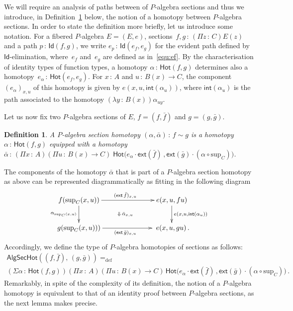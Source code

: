 \documentclass[10pt,a4paper,oneside,reqno]{amsart}
\numberwithin{equation}{section}
\theoremstyle{mythm}
\theoremstyle{mydef}
\newtheorem{definition}[theorem]{Definition}
\theoremstyle{myrmk}
\newcommand{\defeq}{=_{\mathrm{def}}}
\newcommand{\co}{\,{:}\,}
\newcommand{\ct}{\cdot}
\newcommand{\Hot}{\mathsf{Hot}}
\newcommand{\ext}{\mathsf{ext}}
\renewcommand{\int}{\mathsf{int}}
\newcommand{\Id}{\mathsf{Id}}
\renewcommand{\sup}{\mathrm{sup}}
\newcommand{\AlgSecHot}{\mathsf{AlgSecHot}}
\begin{document}
\medskip


We will require an analysis of paths between of $P$-algebra sections and thus we introduce, in Definition~\ref{def:W2cellsection} below, the
notion of a homotopy between $P$-algebra sections. In order to state the definition more briefly, let us introduce some
notation. For a fibered $P$-algebra $E = (E,e)$, sections~$f, g \co (\Pi z \co C) E(z)$ and a path $p \co
\Id(f,g)$, we write $e_p \co \Id(e_f, e_g)$ for the evident path defined by $\Id$-elimination, 
where~$e_f$ and~$e_g$ are defined as in~\eqref{equ:ef}. By the characterisation of identity types of
function types,  a homotopy $\alpha \co \Hot(f,g)$ determines also 
a homotopy~$e_\alpha \co \Hot(e_f, e_g)$. For $x \co A$ and $u \co B(x) \to C$, the 
component $(e_\alpha)_{x,u}$ of this homotopy is given by $e(x, u, \int(\alpha_u))$, where
$\int(\alpha_u)$ is the path associated to the homotopy $(\lambda y \co B(x)) \alpha_{uy}$.

\medskip

Let us now fix two $P$-algebra sections  of $E$,  $f = (f, \bar{f})$ and $g = (g, \bar{g})$. 

\begin{definition} \label{def:W2cellsection}  A \emph{$P$-algebra section homotopy} 
$(\alpha , \bar{\alpha}) \co f  \sim g$  
is a homotopy~$\alpha \co \Hot(f, g)$ equipped with a homotopy
$\bar{\alpha} \co 
(\Pi x \co A) (\Pi u \co B(x) \to C) \;
\Hot\big(  e_\alpha \ct \ext( \bar{f}) \, , 
 \ext( \bar{g}) \ct (\alpha \circ \sup_C)   \big)$.
\end{definition} 

The components of the homotopy $\bar{\alpha}$ that is part of a $P$-algebra section homotopy as above  can be
represented diagrammatically as fitting in the following diagram
\[
\xymatrix@C=2.5cm{
f ( \sup_C(x,u)) \ar[d]_{\alpha_{\sup_C(x,u)}} \ar[r]^{(\ext \, \bar{f})_{x,u}}  
\ar@{}[dr]|{\Downarrow \, \bar{\alpha}_{x,u}}  & e(x,u, fu)  \ar[d]^{e(x,u, \int(\alpha_u))} \\ 
g(\sup_C(x,u)) ) \ar[r]_{(\ext \, \bar{g})_{x,u}} & \;  e(x, u, gu) \, .}
\]
Accordingly, we define the type of $P$-algebra homotopies of sections as follows:
\begin{multline*} 
\AlgSecHot( (f, \bar{f}) ,\, (g, \bar{g}) )  \defeq  \\ 
(\Sigma \alpha \co \Hot( f , g)) 
(\Pi x \co A) 
(\Pi u \co B(x) \to C) \, 
\Hot\big(  e_\alpha \ct \ext( \bar{f}) \, , 
 \ext( \bar{g}) \ct (\alpha \circ \sup_C)   \big) \, .
\end{multline*}
Remarkably, in spite of the complexity of its definition, the notion of a $P$-algebra homotopy is equivalent to
that of an identity proof between $P$-algebra sections, as the next lemma makes precise.
\end{document}
